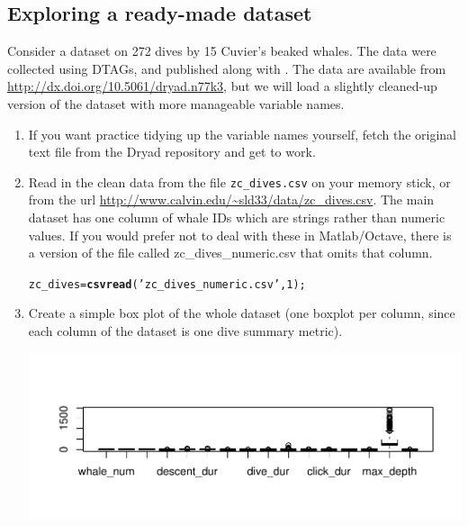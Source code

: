 \documentclass[12pt]{article}\usepackage[]{graphicx}\usepackage[]{color}
\makeatletter
\def\maxwidth{ %
  \ifdim\Gin@nat@width>\linewidth
    \linewidth
  \else
    \Gin@nat@width
  \fi
}
\newcommand{\hlnum}[1]{\textcolor[rgb]{0.686,0.059,0.569}{#1}}%
\newcommand{\hlstr}[1]{\textcolor[rgb]{0.192,0.494,0.8}{#1}}%
\newcommand{\hlstd}[1]{\textcolor[rgb]{0.345,0.345,0.345}{#1}}%
\newcommand{\hlkwb}[1]{\textcolor[rgb]{0.69,0.353,0.396}{#1}}%
\newcommand{\hlkwd}[1]{\textcolor[rgb]{0.737,0.353,0.396}{\textbf{#1}}}%
\newenvironment{kframe}{%
 \def\at@end@of@kframe{}%
 \ifinner\ifhmode%
  \def\at@end@of@kframe{\end{minipage}}%
  \begin{minipage}{\columnwidth}%
 \fi\fi%
 \def\FrameCommand##1{\hskip\@totalleftmargin \hskip-\fboxsep
 \colorbox{shadecolor}{##1}\hskip-\fboxsep
     \hskip-\linewidth \hskip-\@totalleftmargin \hskip\columnwidth}%
 \MakeFramed {\advance\hsize-\width
   \@totalleftmargin\z@ \linewidth\hsize
   \@setminipage}}%
 {\par\unskip\endMakeFramed%
 \at@end@of@kframe}
\newenvironment{knitrout}{}{} %
\makeatother
\begin{document}
\subsection{Exploring a ready-made dataset}
Consider a dataset on 272 dives by 15 Cuvier's beaked whales. The data were collected using DTAGs, and published along with \cite{DeRuiter2013a}. The data are available from \url{http://dx.doi.org/10.5061/dryad.n77k3}, but we will load a slightly cleaned-up version of the dataset with more manageable variable names.  
\begin{enumerate}
\item If you want practice tidying up the variable names yourself, fetch the original text file from the Dryad repository and get to work.
\item Read in the clean data from the file \texttt{zc\_dives.csv} on your memory stick, or from the url \url{http://www.calvin.edu/~sld33/data/zc\_dives.csv}.  The main dataset has one column of whale IDs which are strings rather than numeric values. If you would prefer not to deal with these in Matlab/Octave, there is a version of the file called zc\_dives\_numeric.csv that omits that column.



\begin{knitrout}
\color{fgcolor}\begin{kframe}
\begin{alltt}
\hlstd{zc_dives} \hlkwb{=} \hlkwd{csvread}\hlstd{(}\hlstr{'zc_dives_numeric.csv'}\hlstd{,}\hlnum{1}\hlstd{);}
\end{alltt}
\end{kframe}
\end{knitrout}

\item Create a simple box plot of the whole dataset (one boxplot per column, since each column of the dataset is one dive summary metric).

\begin{knitrout}
\color{fgcolor}
\includegraphics[width=\maxwidth]{figs/real-mdist-simple_boxplot-1} 


\end{knitrout}
\end{enumerate}
\end{document}
